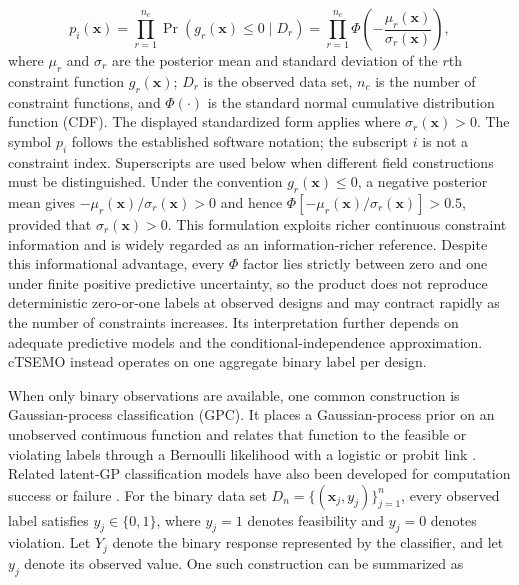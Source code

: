 \documentclass[twoside]{article}
\begin{document}
\begin{equation}
  p_i(\mathbf{x})
  =
  \prod_{r=1}^{n_c}
  \Pr\!\left(g_r(\mathbf{x})\leq0\mid D_r\right)
  =
  \prod_{r=1}^{n_c}
  \Phi\!\left(-\frac{\mu_r(\mathbf{x})}{\sigma_r(\mathbf{x})}\right),
  \label{eq:product-pof}
\end{equation}
where \(\mu_r\) and \(\sigma_r\) are the posterior mean and standard deviation
of the \(r\)th constraint function \(g_r(\mathbf{x})\);
\(D_r\) is the observed data set, \(n_c\) is the number of
constraint functions, and \(\Phi(\cdot)\) is the standard normal cumulative
distribution function (CDF). The displayed standardized form applies where
\(\sigma_r(\mathbf{x})>0\).
The symbol \(p_i\) follows the established software notation; the subscript
\(i\) is not a constraint index. Superscripts are used below when different
field constructions must be distinguished.
Under the convention \(g_r(\mathbf{x})\leq0\), a negative posterior mean gives
\(-\mu_r(\mathbf{x})/\sigma_r(\mathbf{x})>0\) and hence
\(\Phi[-\mu_r(\mathbf{x})/\sigma_r(\mathbf{x})]>0.5\), provided that
\(\sigma_r(\mathbf{x})>0\). This formulation exploits richer continuous
constraint information and is widely regarded as an information-richer
reference. Despite this informational advantage, every \(\Phi\) factor lies
strictly between zero and one under finite positive predictive uncertainty, so the
product does not reproduce deterministic zero-or-one labels at observed
designs and may contract rapidly as the number of constraints increases. Its
interpretation further depends on adequate predictive models and the
conditional-independence approximation. cTSEMO instead operates on one
aggregate binary label per design.

When only binary observations are available, one common construction is
Gaussian-process classification (GPC). It places a Gaussian-process prior on an
unobserved continuous function and relates that function to the feasible or
violating labels through a Bernoulli likelihood with a logistic or probit link
\cite{rasmussen2006gpml,gelbart2014unknown}. Related latent-GP classification
models have also been developed for computation success or failure
\cite{bachoc2020failures}. For the binary data set
\(D_n=\{(\mathbf{x}_j,y_j)\}_{j=1}^{n}\), every observed
label satisfies \(y_j\in\{0,1\}\), where \(y_j=1\) denotes feasibility and
\(y_j=0\) denotes violation. Let \(Y_j\) denote the binary response represented
by the classifier, and let \(y_j\) denote its observed value. One such
construction can be summarized as
\end{document}
